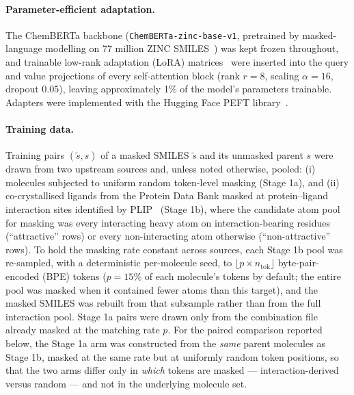\paragraph{Parameter-efficient adaptation.}
The ChemBERTa backbone (\texttt{ChemBERTa-zinc-base-v1}, pretrained by
masked-language modelling on 77 million ZINC
SMILES~\cite{chithrananda2020chemberta}) was kept frozen throughout, and
trainable low-rank adaptation (LoRA) matrices~\cite{hu2022lora} were inserted
into the query and value projections of every self-attention block (rank
$r=8$, scaling $\alpha=16$, dropout $0.05$), leaving approximately 1\% of the
model's parameters trainable. Adapters were implemented with the
Hugging Face PEFT library~\cite{mangrulkar2022peft}.

\paragraph{Training data.}
Training pairs $(\tilde{s}, s)$ of a masked SMILES $\tilde{s}$ and its
unmasked parent $s$ were drawn from two upstream sources and, unless noted
otherwise, pooled: (i) molecules subjected to uniform random token-level
masking (Stage 1a), and (ii) co-crystallised ligands from the Protein Data
Bank masked at protein--ligand interaction sites identified by
PLIP~\cite{salentin2015plip} (Stage 1b), where the candidate atom pool for
masking was every interacting heavy atom on interaction-bearing residues
(``attractive'' rows) or every non-interacting atom otherwise
(``non-attractive'' rows). To hold the masking rate constant across sources,
each Stage 1b pool was re-sampled, with a deterministic per-molecule seed, to
$\lfloor p \times n_{\mathrm{tok}} \rfloor$ byte-pair-encoded (BPE) tokens
($p=15\%$ of each molecule's tokens by default; the entire pool was masked
when it contained fewer atoms than this target), and the masked SMILES was
rebuilt from that subsample rather than from the full interaction pool.
Stage 1a pairs were drawn only from the combination file already masked at
the matching rate $p$. For the paired comparison reported below, the Stage 1a
arm was constructed from the \emph{same} parent molecules as Stage 1b, masked
at the same rate but at uniformly random token positions, so that the two arms
differ only in \emph{which} tokens are masked --- interaction-derived versus
random --- and not in the underlying molecule set.

